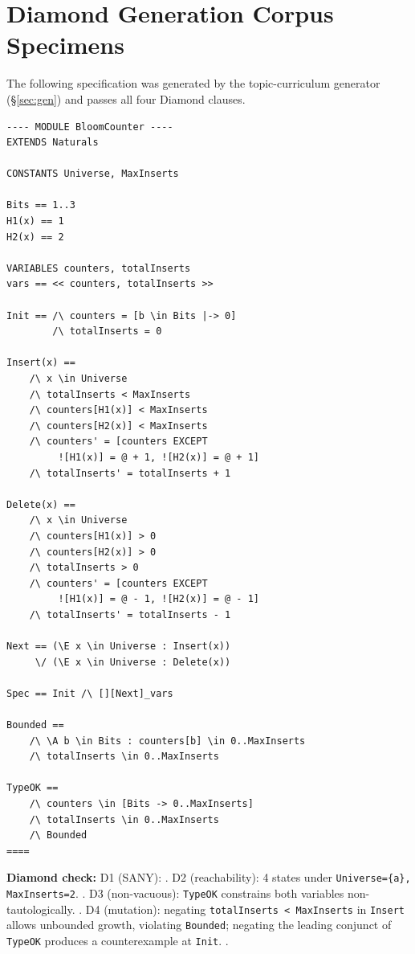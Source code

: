 \documentclass[11pt]{article}
\begin{document}
\clearpage
\section{Diamond Generation Corpus Specimens}
\label{app:corpus}

The following specification was generated by the topic-curriculum
generator (\S\ref{sec:gen}) and passes all four Diamond clauses.

\begin{tcolorbox}[
  enhanced,
  colback=cbox, colframe=c3, boxrule=0.5pt,
  arc=2pt, left=6pt, right=6pt, top=3pt, bottom=3pt,
  title={\textbf{BloomCounter} --- topic: data\_structures; 4 states; Diamond tier~4}, fonttitle=\small,
]
\begin{lstlisting}[language=TLA]
---- MODULE BloomCounter ----
EXTENDS Naturals

CONSTANTS Universe, MaxInserts

Bits == 1..3
H1(x) == 1
H2(x) == 2

VARIABLES counters, totalInserts
vars == << counters, totalInserts >>

Init == /\ counters = [b \in Bits |-> 0]
        /\ totalInserts = 0

Insert(x) ==
    /\ x \in Universe
    /\ totalInserts < MaxInserts
    /\ counters[H1(x)] < MaxInserts
    /\ counters[H2(x)] < MaxInserts
    /\ counters' = [counters EXCEPT
         ![H1(x)] = @ + 1, ![H2(x)] = @ + 1]
    /\ totalInserts' = totalInserts + 1

Delete(x) ==
    /\ x \in Universe
    /\ counters[H1(x)] > 0
    /\ counters[H2(x)] > 0
    /\ totalInserts > 0
    /\ counters' = [counters EXCEPT
         ![H1(x)] = @ - 1, ![H2(x)] = @ - 1]
    /\ totalInserts' = totalInserts - 1

Next == (\E x \in Universe : Insert(x))
     \/ (\E x \in Universe : Delete(x))

Spec == Init /\ [][Next]_vars

Bounded ==
    /\ \A b \in Bits : counters[b] \in 0..MaxInserts
    /\ totalInserts \in 0..MaxInserts

TypeOK ==
    /\ counters \in [Bits -> 0..MaxInserts]
    /\ totalInserts \in 0..MaxInserts
    /\ Bounded
====
\end{lstlisting}
\end{tcolorbox}

\noindent \textbf{Diamond check:}
D1 (SANY): \checkmark.
D2 (reachability): 4 states under \texttt{Universe=\{a\},
MaxInserts=2}. \checkmark.
D3 (non-vacuous): \texttt{TypeOK} constrains both variables
non-tautologically. \checkmark.
D4 (mutation): negating \texttt{totalInserts < MaxInserts} in
\texttt{Insert} allows unbounded growth, violating \texttt{Bounded};
negating the leading conjunct of \texttt{TypeOK} produces a
counterexample at \texttt{Init}. \checkmark.
\end{document}
